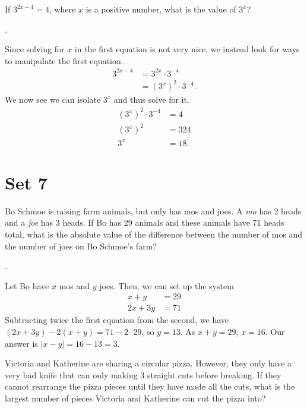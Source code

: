 \documentclass[11pt]{article}
\begin{document}
\begin{problem}If $3^{2x-4} = 4$, where $x$ is a positive number, what is the value of $3^{x}$?
\end{problem}
\begin{answer}
.
\end{answer}
\begin{solution}
Since solving for $x$ in the first equation is not very nice, we instead look for ways to manipulate the first equation.
\begin{align*}
3^{2x-4} &= 3^{2x} \cdot 3^{-4} \\
&= (3^x)^2 \cdot 3^{-4}.
\end{align*}
We now see we can isolate  $3^{x}$ and thus solve for it.
\begin{align*}
(3^x)^2 \cdot 3^{-4} &= 4 \\
(3^x)^2 &= 324 \\
3^x &= \boxed{18}.
\end{align*}
\end{solution}

\eject

\section*{Set 7}

\begin{problem}  Bo Schmoe is raising farm animals, but only has mos and joes. A \emph{mo} has 2 heads and a \emph{joe} has 3 heads. If Bo has 29 animals and these animals have 71 heads total, what is the absolute value of the difference between the number of mos and the number of joes on Bo Schmoe's farm?
\end{problem}

\begin{answer} . \end{answer}
\begin{solution}
Let Bo have $x$ mos and $y$ joes. Then, we can set up the system
\begin{align*}
x + y &= 29 \\
2x + 3y &= 71
\end{align*}
Subtracting twice the first equation from the second, we have $(2x + 3y) - 2(x + y) = 71 - 2 \cdot 29$, so $y = 13$. As $x + y = 29$, $x = 16$. Our answer is $\left| x - y \right| = 16 - 13 = \boxed{3}$.
\end{solution}

\begin{problem} Victoria and Katherine are sharing a circular pizza. However, they only have a very bad knife that can only making 3 straight cuts before breaking. If they cannot rearrange the pizza pieces until they have made all the cuts, what is the largest number of pieces Victoria and Katherine can cut the pizza into?
\end{problem}
\end{document}
